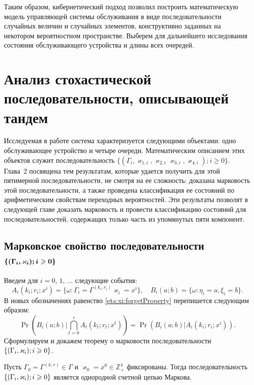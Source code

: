 \documentclass[a4paper,12pt,russian]{extarticle}
\newcommand{\Mark}{\{(\Gamma_i, \varkappa_i); \hm{} i \geqslant 0\}}
\newcommand{\MarkThree}{\{(\Gamma_i, \varkappa_{3,i}); \hm{} i \geqslant 0\}}
\begin{document}
Таким образом, кибернетический подход позволил построить математическую модель управляющей системы обслуживания в виде последовательности случайных величин и случайных элементов, конструктивно заданных на некотором вероятностном пространстве. Выберем для дальнейшего исследования состояния обслуживающего устройства и длины всех очередей.
\newpage
\section{Анализ стохастической последовательности, описывающей тандем}
Исследуемая в работе система характеризуется следующими объектами: одно обслуживающее устройство и четыре очереди. Математическим описанием этих объектов служит последовательность 
 $\{(\Gamma_i, \varkappa_{1,i}, \varkappa_{2,i}\varkappa_{3,i},  \varkappa_{4,i}); i \geqslant 0\}$. Глава~2 посвящена тем результатам, которые удается получить для этой пятимерной последовательности, не смотря на ее сложность: доказана марковость этой последовательности, а также проведена классификация ее состояний по арифметическим свойствам переходных вероятностей. Эти результаты позволят в следующей главе доказать марковость и провести классификацию состояний для последовательностей, содержащих только часть из упомянутых пяти компонент.
 
\subsection[Марковское свойство последовательности $\boldsymbol{\Mark}$]%
{Марковское свойство последовательности $\boldsymbol{\Mark}$}


Введем для $i=0$, $1$, $\ldots$ следующие события:
\begin{equation*}
A_i(k_i;r_i;x^i) = \{\omega\colon\Gamma_i=\Gamma^{(k_i,r_i)}\varkappa_i=x^i\}, \quad  B_i(a;b) = \{\omega\colon\eta_i=a, \xi_i=b\}.
\end{equation*}
В новых обозначениях равенство \eqref{eta:xi:forgetProperty}  перепишется следующим образом:
\begin{equation}
\Pr (B_i(a;b) | \bigcap_{t=0}^{i} A_t(k_t;r_t;x^t)) = \Pr (B_i(a;b) |  A_i(k_i;r_i;x^i)).
\label{new:notation:eta:xi:forget}
\end{equation}
Сформулируем и докажем теорему о марковости последовательности $\Mark$.
\begin{theorem}
Пусть $\Gamma_0=\Gamma^{(k,r)}\in \Gamma$ и $\varkappa_0=x^0\in \mathbb{Z}_+^4$ фиксированы. Тогда последовательность $\Mark$ является однородной счетной цепью Маркова. 
\end{theorem}
\end{document}
